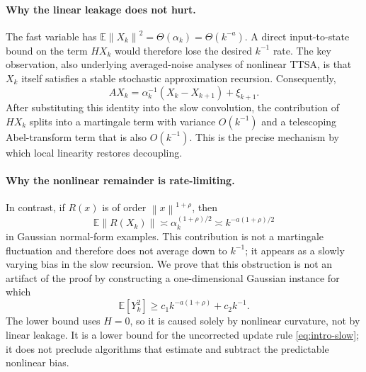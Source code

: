 \documentclass{article}
\newcommand{\E}{\mathbb{E}}
\newcommand{\norm}[1]{\left\lVert #1\right\rVert}
\begin{document}
\paragraph{Why the linear leakage does not hurt.}
The fast variable has $\E\norm{X_k}^2=\Theta(\alpha_k)=\Theta(k^{-a})$. A direct input-to-state bound on the term $HX_k$ would therefore lose the desired $k^{-1}$ rate. The key observation, also underlying averaged-noise analyses of nonlinear TTSA, is that $X_k$ itself satisfies a stable stochastic approximation recursion. Consequently,
\[
  AX_k = \alpha_k^{-1}(X_k-X_{k+1})+\xi_{k+1}.
\]
After substituting this identity into the slow convolution, the contribution of $HX_k$ splits into a martingale term with variance $O(k^{-1})$ and a telescoping Abel-transform term that is also $O(k^{-1})$. This is the precise mechanism by which local linearity restores decoupling.

\paragraph{Why the nonlinear remainder is rate-limiting.}
In contrast, if $R(x)$ is of order $\norm{x}^{1+\rho}$, then
\[
  \E\norm{R(X_k)} \asymp \alpha_k^{(1+\rho)/2}\asymp k^{-a(1+\rho)/2}
\]
in Gaussian normal-form examples. This contribution is not a martingale fluctuation and therefore does not average down to $k^{-1}$; it appears as a slowly varying bias in the slow recursion. We prove that this obstruction is not an artifact of the proof by constructing a one-dimensional Gaussian instance for which
\begin{equation}
  \E[Y_k^2] \ge c_1 k^{-a(1+\rho)}+c_2 k^{-1}. \label{eq:intro-lower}
\end{equation}
The lower bound uses $H=0$, so it is caused solely by nonlinear curvature, not by linear leakage. It is a lower bound for the uncorrected update rule \eqref{eq:intro-slow}; it does not preclude algorithms that estimate and subtract the predictable nonlinear bias.
\end{document}
